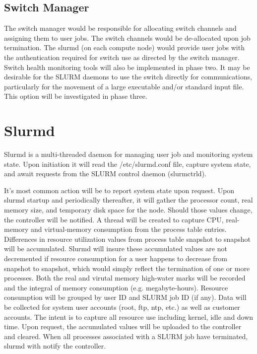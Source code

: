 \subsection{Switch Manager}

The switch manager would be responsible for allocating switch channels and assigning 
them to user jobs. The switch channels would be de-allocated upon job termination. 
The slurmd (on each compute node) would provide user jobs with the authentication 
required for switch use as directed by the switch manager. Switch health monitoring tools will 
also be implemented in phase two. It may be desirable for the SLURM daemons to use the
switch directly for communications, particularly for the movement of a large 
executable and/or standard input file. This option will be investigated in phase
three. 

\section{Slurmd}

Slurmd is a multi-threaded daemon for managing user job and 
monitoring system state. 
Upon initiation it will read the /etc/slurmd.conf file, capture 
system state, and await requests from the SLURM control daemon 
(slurmctrld). 

It's most common action will be to report system state upon 
request. Upon slurmd startup and periodically thereafter, it 
will gather the processor count, real memory size, and temporary 
disk space for the node. Should those values change, the 
controller will be notified. A thread will be created to capture CPU, real-memory 
and virtual-memory consumption from the process table entries. 
Differences in resource utilization values from process table 
snapshot to snapshot will be accumulated. Slurmd will 
insure these accumulated values are not decremented if resource 
consumption for a user happens to decrease from snapshot to 
snapshot, which would simply reflect the termination of 
one or more processes.
Both the real and virutal memory high-water marks will be recorded and the 
integral of memory consumption (e.g. megabyte-hours).
Resource consumption will be grouped by user ID and 
SLURM job ID (if any). Data will be collected for 
system user accounts (root, ftp, ntp, etc.) as well as 
customer accounts. The intent is to capture all resource 
use including kernel, idle and down time. 
Upon request, the accumulated values will be uploaded to 
the controller and cleared. 
When all processes associated with a SLURM job have terminated, 
slurmd with notify the controller. 

